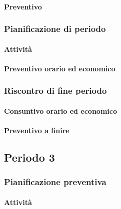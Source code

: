 \paragraph{Preventivo}

\subsubsection{Pianificazione di periodo}




\paragraph{Attività}

\paragraph{Preventivo orario ed economico}



\subsubsection{Riscontro di fine periodo}


\paragraph{Consuntivo orario ed economico}


\paragraph{Preventivo a finire}






\subsection{Periodo 3}

\subsubsection{Pianificazione preventiva}

\paragraph{Attività}

\planningTable{
	
}


